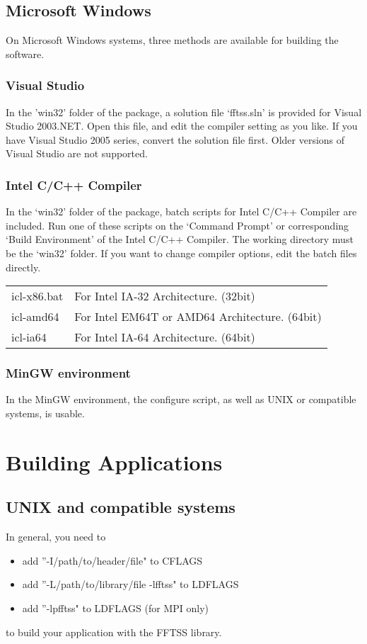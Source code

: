 \documentclass{article}
\begin{document}
\subsection{Microsoft Windows}
On Microsoft Windows systems, three methods are available 
for building the software.

\subsubsection{Visual Studio}
In the 'win32' folder of the package, a solution file `fftss.sln' 
is provided for Visual Studio 2003.NET. Open this file, and edit the 
compiler setting as you like.
If you have Visual Studio 2005 series, convert the solution file first.
Older versions of Visual Studio are not supported.

\subsubsection{Intel C/C++ Compiler}
In the `win32' folder of the package, batch scripts for Intel C/C++ Compiler
 are included. Run one of these scripts on the `Command Prompt' or 
corresponding `Build Environment' of the Intel C/C++ Compiler.
The working directory must be the `win32' folder.
If you want to change compiler options, edit the batch files directly.
\\

\begin{tabular}{ll}
icl-x86.bat&For Intel IA-32 Architecture. (32bit)\\
icl-amd64&For Intel EM64T or AMD64 Architecture. (64bit)\\
icl-ia64&For Intel IA-64 Architecture. (64bit)\\
\end{tabular}

\subsubsection{MinGW environment}
In the MinGW environment, the configure script, as well as 
UNIX or compatible systems, is usable.

\section{Building Applications}

\subsection{UNIX and compatible systems}
In general, you need to
\begin{itemize}
\item{add ''-I/path/to/header/file" to CFLAGS}
\item{add ''-L/path/to/library/file -lfftss" to LDFLAGS}
\item{add ''-lpfftss" to LDFLAGS (for MPI only)}
\end{itemize}
to build your application with the FFTSS library.
\end{document}
